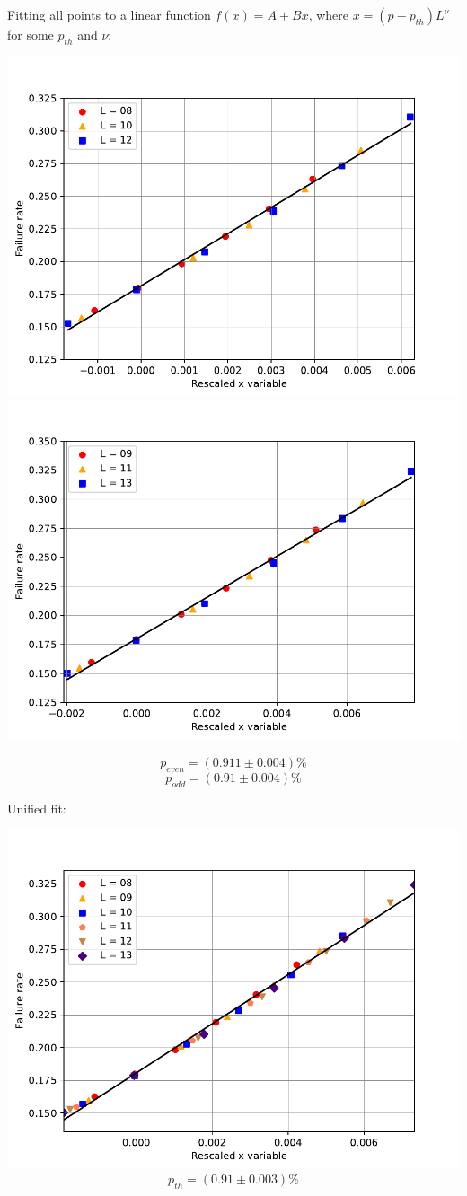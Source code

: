 \documentclass[pra]{revtex4-1}
\begin{document}
\noindent Fitting all points to a linear function $f(x) = A + Bx$, where $x=(p-p_{th})L^{\nu}$ for some $p_{th}$ and $\nu$: 
  
\includegraphics[width=.49\textwidth]{../graphs-paper2/mcf-dephasing-even-rescaled.pdf}
\includegraphics[width=.49\textwidth]{../graphs-paper2/mcf-dephasing-odd-rescaled.pdf}

\[  p_{even} = (0.911 \pm 0.004)\% \]
\[  p_{odd} = (0.91 \pm 0.004)\% \]
\clearpage 

Unified fit: \begin{center} 

\includegraphics[width=.9\textwidth]{../graphs-paper2/mcf-dephasing-rescaled.pdf}
\[  p_{th} = (0.91 \pm 0.003)\% \] \end{center}
\clearpage 
\end{document}
